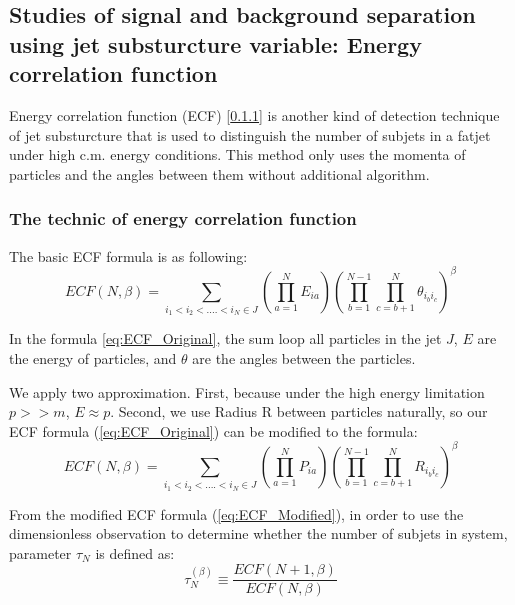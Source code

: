 \subsection{Studies of signal and background separation using jet substurcture variable: Energy correlation function}
Energy correlation function (ECF) [\ref{}] is another kind of detection technique of jet substurcture that is used to distinguish the number of subjets in a fatjet under high c.m. energy conditions. This method only uses the momenta of particles and the angles between them without additional algorithm.\\
\subsubsection{The technic of energy correlation function}
The basic ECF formula is as following:\\
\begin{equation} \label{eq:ECF_Original}
ECF(N,\beta)=\sum_{i_{1}<i_{2}<....<i_{N}\in J} (\prod_{a=1}^{N}E_{ia})(\prod_{b=1}^{N-1}\prod_{c=b+1}^{N} \theta_{i_{b}i_{c}})^{\beta}
\end{equation}

In the formula \ref{eq:ECF_Original}, the sum loop all particles in the jet $J$, $E$ are the energy of particles, and $\theta$ are the angles between the particles.

We apply two approximation. First, because under the high energy limitation $p>>m$, $E\approx p$. Second, we use Radius R between particles naturally, so our ECF formula (\ref{eq:ECF_Original}) can be modified to the formula:\\  
\begin{equation} \label{eq:ECF_Modified}
ECF(N,\beta)=\sum_{i_{1}<i_{2}<....<i_{N}\in J} (\prod_{a=1}^{N}P_{ia})(\prod_{b=1}^{N-1}\prod_{c=b+1}^{N} R_{i_{b}i_{c}})^{\beta}
\end{equation}

From the modified ECF formula (\ref{eq:ECF_Modified}), in order to use the dimensionless observation to determine whether the number of subjets in system, parameter $\tau_{N}$ is defined as:\\
\begin{equation} \label{eq:ECF_ratio}
\tau_{N}^{(\beta)}\equiv\frac{ECF(N+1,\beta)}{ECF(N,\beta)}
\end{equation}


